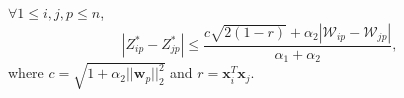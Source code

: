 \begin{lemma}
\label{lemma2}
$\forall 1 \leq i, j, p \leq n$,
\begin{equation}
\label{eq:norm}
|Z_{ip}^*-Z_{jp}^*| \leq \frac{c\sqrt{2(1-r)} + \alpha_2|\mathcal{W}_{ip}-\mathcal{W}_{jp}|}{\alpha_1+\alpha_2},
\end{equation}
where $c = \sqrt{1+\alpha_2||\bm{w}_p||_2^2}$ and $r = \bm{x}_i^T\bm{x}_j$.
\end{lemma}


